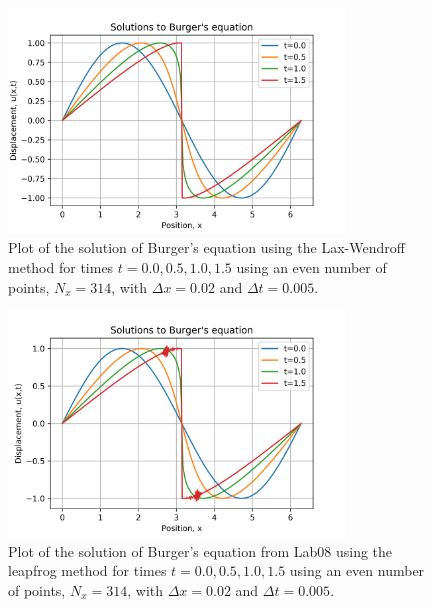 \documentclass{article}
\begin{document}
\begin{figure}[H]
	\centering
	\includegraphics[width=0.8\textwidth]{../images/burgers.png}
	\caption{Plot of the solution of Burger's equation using the Lax-Wendroff method for times $t=0.0,0.5,1.0,1.5$ using an even number of points, $N_x=314$, with $\Delta x=0.02$ and $\Delta t=0.005$.}
	\label{fig:burgers_lax}
\end{figure}

\begin{figure}[H]
	\centering
	\includegraphics[width=0.8\textwidth]{../images/burgers_old.png}
	\caption{Plot of the solution of Burger's equation from Lab08 using the leapfrog method for times $t=0.0,0.5,1.0,1.5$ using an even number of points, $N_x=314$, with $\Delta x=0.02$ and $\Delta t=0.005$.}
	\label{fig:burgers_leapfrog}
\end{figure}
\end{document}
